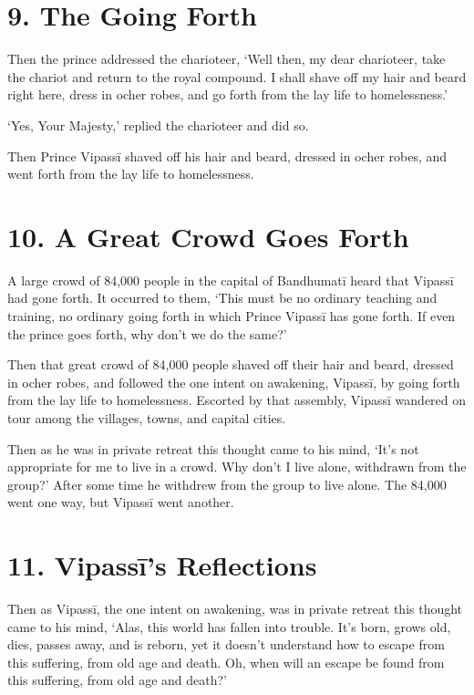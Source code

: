\documentclass[12pt,openany]{book}%
\begin{document}
\section*{9. The Going Forth }

Then the prince addressed the charioteer, ‘Well then, my dear charioteer, take the chariot and return to the royal compound. I shall shave off my hair and beard right here, dress in ocher robes, and go forth from the lay life to homelessness.’ 

‘Yes, Your Majesty,’ replied the charioteer and did so. 

Then Prince \textsanskrit{Vipassī} shaved off his hair and beard, dressed in ocher robes, and went forth from the lay life to homelessness. 

\section*{10. A Great Crowd Goes Forth }

A large crowd of 84,000 people in the capital of \textsanskrit{Bandhumatī} heard that \textsanskrit{Vipassī} had gone forth. It occurred to them, ‘This must be no ordinary teaching and training, no ordinary going forth in which Prince \textsanskrit{Vipassī} has gone forth. If even the prince goes forth, why don’t we do the same?’ 

Then that great crowd of 84,000 people shaved off their hair and beard, dressed in ocher robes, and followed the one intent on awakening, \textsanskrit{Vipassī}, by going forth from the lay life to homelessness. Escorted by that assembly, \textsanskrit{Vipassī} wandered on tour among the villages, towns, and capital cities. 

Then as he was in private retreat this thought came to his mind, ‘It’s not appropriate for me to live in a crowd. Why don’t I live alone, withdrawn from the group?’ After some time he withdrew from the group to live alone. The 84,000 went one way, but \textsanskrit{Vipassī} went another. 

\section*{11. \textsanskrit{Vipassī}’s Reflections }

Then as \textsanskrit{Vipassī}, the one intent on awakening, was in private retreat this thought came to his mind, ‘Alas, this world has fallen into trouble. It’s born, grows old, dies, passes away, and is reborn, yet it doesn’t understand how to escape from this suffering, from old age and death. Oh, when will an escape be found from this suffering, from old age and death?’ 
\end{document}

